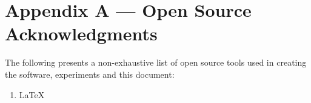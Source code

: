 \chapter{Appendix A --- Open Source Acknowledgments}

The following presents a non-exhaustive list of open source tools used in
creating the software, experiments and this document:
\begin{enumerate}
    \item \LaTeX
\end{enumerate}

